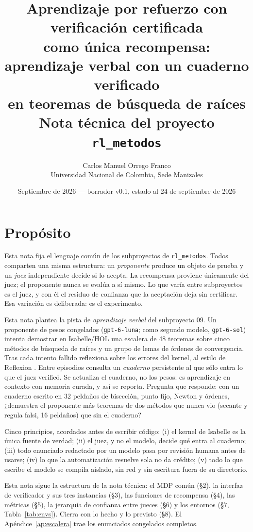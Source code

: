 \documentclass[11pt,a4paper]{article}
\title{Aprendizaje por refuerzo con verificación certificada\\como única recompensa:\\aprendizaje verbal con un cuaderno verificado\\en teoremas de búsqueda de raíces\\[0.4em]\large Nota técnica del proyecto \texttt{rl\_metodos}}
\author{Carlos Manuel Orrego Franco\\Universidad Nacional de Colombia, Sede Manizales}
\date{Septiembre de 2026 --- borrador v0.1, estado al 24 de septiembre de 2026}
\begin{document}
\maketitle

\section{Propósito}

Esta nota fija el lenguaje común de los subproyectos de \texttt{rl\_metodos}. Todos comparten una misma estructura: un \emph{proponente} produce un objeto de prueba y un \emph{juez} independiente decide si lo acepta. La recompensa proviene únicamente del juez; el proponente nunca se evalúa a sí mismo. Lo que varía entre subproyectos es el juez, y con él el residuo de confianza que la aceptación deja sin certificar. Esa variación es deliberada: es el experimento.

Esta nota plantea la pista de \emph{aprendizaje verbal} del subproyecto 09. Un proponente de pesos congelados (\texttt{gpt-\allowbreak{}6-\allowbreak{}luna}; como segundo modelo, \texttt{gpt-\allowbreak{}6-\allowbreak{}sol}) intenta demostrar en Isabelle/HOL \citep{NipkowPaulsonWenzel2002} una escalera de 48 teoremas sobre cinco métodos de búsqueda de raíces y un grupo de lemas de órdenes de convergencia. Tras cada intento fallido reflexiona sobre los errores del kernel, al estilo de Reflexion \citep{Shinn2023}. Entre episodios consulta un \emph{cuaderno} persistente al que sólo entra lo que el juez verificó. Se actualiza el cuaderno, no los pesos: es aprendizaje en contexto con memoria curada, y así se reporta. Pregunta que responde: con un cuaderno escrito en 32 peldaños de bisección, punto fijo, Newton y órdenes, ¿demuestra el proponente más teoremas de dos métodos que nunca vio (secante y regula falsi, 16 peldaños) que sin el cuaderno?

Cinco principios, acordados antes de escribir código: (i) el kernel de Isabelle es la única fuente de verdad; (ii) el juez, y no el modelo, decide qué entra al cuaderno; (iii) todo enunciado redactado por un modelo pasa por revisión humana antes de usarse; (iv) lo que la automatización resuelve sola no da crédito; (v) todo lo que escribe el modelo se compila aislado, sin red y sin escritura fuera de su directorio.

Esta nota sigue la estructura de la nota técnica: el MDP común (§2), la interfaz de verificador y sus tres instancias (§3), las funciones de recompensa (§4), las métricas (§5), la jerarquía de confianza entre jueces (§6) y los entornos (§7, Tabla~\ref{tab:envs}). Cierra con lo hecho y lo previsto (§8). El Apéndice~\ref{ap:escalera} trae los enunciados congelados completos.
\end{document}
